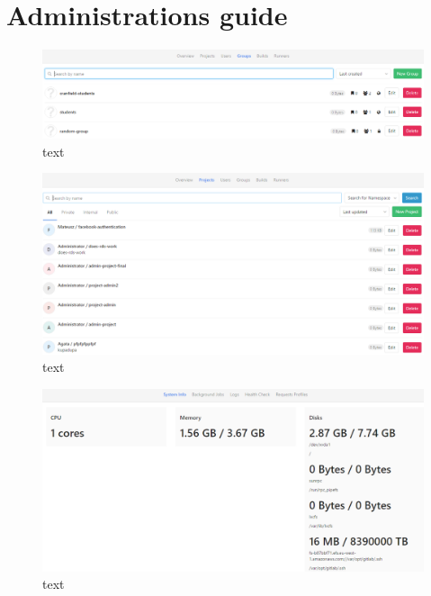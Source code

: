 \section{Administrations guide} \label{s:platform-user-guide:administrations}
	\begin{figure}[!htbp]
		\centering
		\includegraphics[width=1\textwidth]{img/ug-administartion/groups}
		\caption{text}
		\label{key}
	\end{figure}

	\begin{figure}[!htbp]
		\centering
		\includegraphics[width=1\textwidth]{img/ug-administartion/projects}
		\caption{text}
		\label{key}
	\end{figure}

	\begin{figure}[!htbp]
		\centering
		\includegraphics[width=1\textwidth]{img/ug-administartion/monitoring}
		\caption{text}
		\label{key}
	\end{figure}

